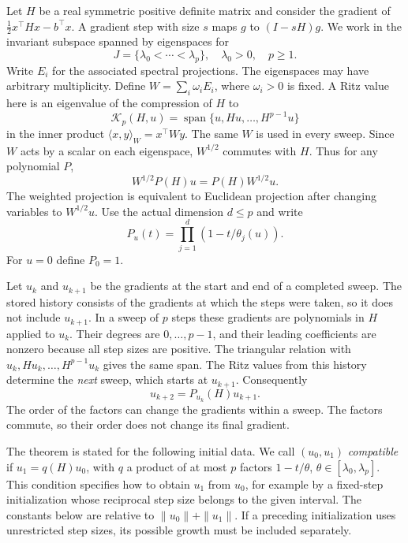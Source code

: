 \documentclass[11pt,a4paper]{article}
\numberwithin{equation}{section}
\begin{document}
Let \(H\) be a real symmetric positive definite matrix and consider the gradient of \(\tfrac12 x^\top Hx-b^\top x\). A gradient step with size \(s\) maps \(g\) to \((I-sH)g\). We work in the invariant subspace spanned by eigenspaces for
\[
  J=\{\lambda_0<\cdots<\lambda_p\},\quad \lambda_0>0,\quad p\ge1.
\]
Write \(E_i\) for the associated spectral projections. The eigenspaces may have arbitrary multiplicity. Define \(W=\sum_i\omega_i E_i\), where \(\omega_i>0\) is fixed. A Ritz value here is an eigenvalue of the compression of \(H\) to
\[
  \mathcal K_p(H,u)=\operatorname{span}\{u,Hu,\ldots,H^{p-1}u\}
\]
in the inner product \(\langle x,y\rangle_W=x^\top Wy\). The same \(W\) is used in every sweep. Since \(W\) acts by a scalar on each eigenspace, \(W^{1/2}\) commutes with \(H\). Thus for any polynomial \(P\),
\[
 W^{1/2}P(H)u=P(H)W^{1/2}u.
\]
The weighted projection is equivalent to Euclidean projection after changing variables to \(W^{1/2}u\). Use the actual dimension \(d\le p\) and write
\[
  P_u(t)=\prod_{j=1}^{d}(1-t/\theta_j(u)).
\]
For \(u=0\) define \(P_0=1\).

Let \(u_k\) and \(u_{k+1}\) be the gradients at the start and end of a completed sweep. The stored history consists of the gradients at which the steps were taken, so it does not include \(u_{k+1}\). In a sweep of \(p\) steps these gradients are polynomials in \(H\) applied to \(u_k\). Their degrees are \(0,\ldots,p-1\), and their leading coefficients are nonzero because all step sizes are positive. The triangular relation with \(u_k,Hu_k,\ldots,H^{p-1}u_k\) gives the same span. The Ritz values from this history determine the \emph{next} sweep, which starts at \(u_{k+1}\). Consequently
\begin{equation}\label{eq:rule}
 u_{k+2}=P_{u_k}(H)u_{k+1}.
\end{equation}
The order of the factors can change the gradients within a sweep. The factors commute, so their order does not change its final gradient.

The theorem is stated for the following initial data. We call
\((u_0,u_1)\) \emph{compatible} if \(u_1=q(H)u_0\), with \(q\) a product of at most \(p\) factors \(1-t/\theta\), \(\theta\in[\lambda_0,\lambda_p]\). This condition specifies how to obtain \(u_1\) from \(u_0\), for example by a fixed-step initialization whose reciprocal step
size belongs to the given interval. The constants below are relative
to \(\|u_0\|+\|u_1\|\). If a preceding initialization uses unrestricted
step sizes, its possible growth must be included separately.
\end{document}
